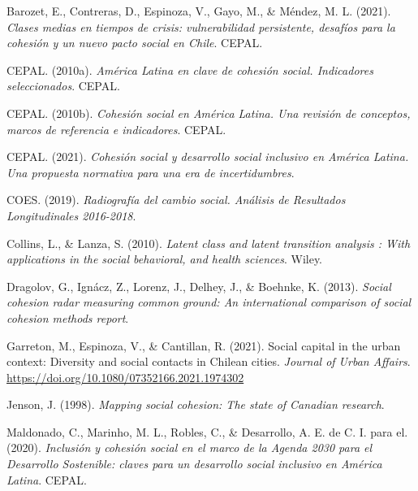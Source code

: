 \documentclass[
  12pt,
]{book}
\newlength{\cslhangindent}
\newlength{\cslentryspacingunit} %
\newenvironment{CSLReferences}[2] %
 {%
  \setlength{\parindent}{0pt}
  \ifodd #1
  \let\oldpar\par
  \def\par{\hangindent=\cslhangindent\oldpar}
  \fi
  \setlength{\parskip}{#2\cslentryspacingunit}
 }%
 {}
\begin{document}
\hypertarget{refs}{}
\begin{CSLReferences}{1}{0}
\leavevmode{}%
Barozet, E., Contreras, D., Espinoza, V., Gayo, M., \& Méndez, M. L. (2021). \emph{{Clases medias en tiempos de crisis: vulnerabilidad persistente, desafíos para la cohesión y un nuevo pacto social en Chile}}. {CEPAL}.

\leavevmode{}%
CEPAL. (2010a). \emph{América {Latina} en clave de cohesión social. {Indicadores} seleccionados}. {CEPAL}.

\leavevmode{}%
CEPAL. (2010b). \emph{Cohesión social en {América Latina}. {Una} revisión de conceptos, marcos de referencia e indicadores}. {CEPAL}.

\leavevmode{}%
CEPAL. (2021). \emph{Cohesión social y desarrollo social inclusivo en {América Latina}. {Una} propuesta normativa para una era de incertidumbres}.

\leavevmode{}%
COES. (2019). \emph{Radiografía del cambio social. {Análisis} de {Resultados Longitudinales} 2016-2018}.

\leavevmode{}%
Collins, L., \& Lanza, S. (2010). \emph{Latent class and latent transition analysis : With applications in the social behavioral, and health sciences}. {Wiley}.

\leavevmode{}%
Dragolov, G., Ignácz, Z., Lorenz, J., Delhey, J., \& Boehnke, K. (2013). \emph{Social cohesion radar measuring common ground: An international comparison of social cohesion methods report}.

\leavevmode{}%
Garreton, M., Espinoza, V., \& Cantillan, R. (2021). Social capital in the urban context: Diversity and social contacts in {Chilean} cities. \emph{Journal of Urban Affairs}. \url{https://doi.org/10.1080/07352166.2021.1974302}

\leavevmode{}%
Jenson, J. (1998). \emph{Mapping social cohesion: The state of {Canadian} research}.

\leavevmode{}%
Maldonado, C., Marinho, M. L., Robles, C., \& Desarrollo, A. E. de C. I. para el. (2020). \emph{{Inclusión y cohesión social en el marco de la Agenda 2030 para el Desarrollo Sostenible: claves para un desarrollo social inclusivo en América Latina}}. {CEPAL}.


\end{CSLReferences}
\end{document}
